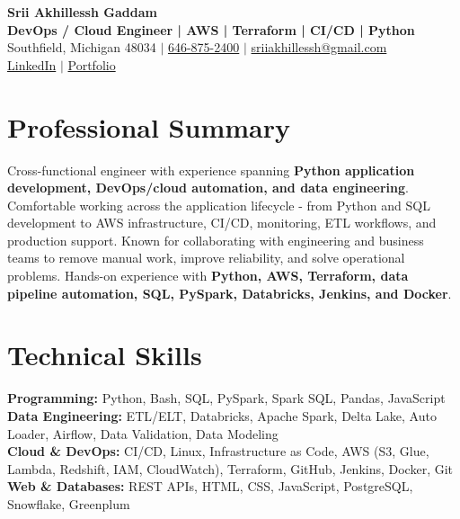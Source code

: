 \documentclass[letterpaper,10pt]{article}
\begin{document}
\fontsize{9.35pt}{10.45pt}\selectfont

\begin{center}
    {\LARGE \textbf{Srii Akhillessh Gaddam}} \\[-1pt]
    \textbf{DevOps / Cloud Engineer | AWS | Terraform | CI/CD | Python} \\[2pt]
    Southfield, Michigan 48034 $|$
    \href{tel:6468752400}{646-875-2400} $|$
    \href{mailto:sriiakhillessh@gmail.com}{sriiakhillessh@gmail.com} \\[1pt]
    \href{https://www.linkedin.com/in/srii-akhiilessh-gaddam-b48668191/}{LinkedIn} $|$
    \href{https://sriiakhillesshg.github.io/portfolio/}{Portfolio}
\end{center}
\vspace{-8pt}

\section{Professional Summary}
\small{Cross-functional engineer with experience spanning \textbf{Python application development, DevOps/cloud automation, and data engineering}. Comfortable working across the application lifecycle - from Python and SQL development to AWS infrastructure, CI/CD, monitoring, ETL workflows, and production support. Known for collaborating with engineering and business teams to remove manual work, improve reliability, and solve operational problems. Hands-on experience with \textbf{Python, AWS, Terraform, data pipeline automation, SQL, PySpark, Databricks, Jenkins, and Docker}.}

\section{Technical Skills}
\small{
\textbf{Programming:} Python, Bash, SQL, PySpark, Spark SQL, Pandas, JavaScript \\
\textbf{Data Engineering:} ETL/ELT, Databricks, Apache Spark, Delta Lake, Auto Loader, Airflow, Data Validation, Data Modeling \\
\textbf{Cloud \& DevOps:} CI/CD, Linux, Infrastructure as Code, AWS (S3, Glue, Lambda, Redshift, IAM, CloudWatch), Terraform, GitHub, Jenkins, Docker, Git \\
\textbf{Web \& Databases:} REST APIs, HTML, CSS, JavaScript, PostgreSQL, Snowflake, Greenplum
}
\end{document}
